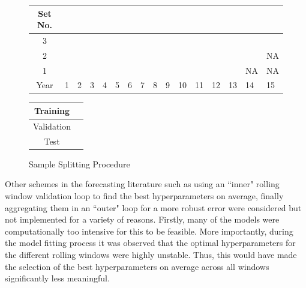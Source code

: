 \documentclass{article}
\begin{document}
\begin{figure}[!htb]
	\begin{center}
		\begin{tabular}{|c|p{0.30cm}p{0.30cm}p{0.30cm}p{0.30cm}p{0.30cm}p{0.30cm}p{0.30cm}p{0.30cm}p{0.30cm}p{0.30cm}p{0.30cm}p{0.30cm}p{0.30cm}p{0.30cm}p{0.30cm}|}
			\hline
			Set No. &&&&&&&&&&&&&&& \\
			\hline
			3 & \cellcolor{cyan} & \cellcolor{cyan} & \cellcolor{cyan} & \cellcolor{cyan} & \cellcolor{cyan} & \cellcolor{cyan} & \cellcolor{cyan} & \cellcolor{cyan} & \cellcolor{cyan} &
			\cellcolor{pink} & \cellcolor{pink} & \cellcolor{pink} & \cellcolor{pink} & \cellcolor{pink} & 	
			\cellcolor{olive} \\
			2 & \cellcolor{cyan} & \cellcolor{cyan} & \cellcolor{cyan} & \cellcolor{cyan} & \cellcolor{cyan} & \cellcolor{cyan} & \cellcolor{cyan} & \cellcolor{cyan} &
			\cellcolor{pink} & \cellcolor{pink} & \cellcolor{pink} & \cellcolor{pink} & \cellcolor{pink} & 	
			\cellcolor{olive} & NA  \\
			1 & \cellcolor{cyan} & \cellcolor{cyan} & \cellcolor{cyan} & \cellcolor{cyan} & \cellcolor{cyan} & \cellcolor{cyan} & \cellcolor{cyan} &
			\cellcolor{pink} & \cellcolor{pink} & \cellcolor{pink} & \cellcolor{pink} & \cellcolor{pink} & 	
			\cellcolor{olive} & NA & NA \\
			\hline
			Year & 1 & 2 & 3 & 4 & 5 & 6 & 7 & 8 & 9 & 10 & 11 & 12 & 13 & 14 & 15\\
			\hline
		\end{tabular}
		\medskip
		\begin{tabular}{|c|p{0.30cm}|}
			\hline
			Training & \cellcolor{cyan} \\
			\hline
			Validation & \cellcolor{pink} \\
			\hline
			Test & \cellcolor{olive} \\
			\hline
		\end{tabular}
	\end{center}
	\caption{Sample Splitting Procedure}
	\label{sample_split_diag}
\end{figure}

Other schemes in the forecasting literature such as using an ``inner" rolling window validation loop to find the best hyperparameters on average, finally aggregating them in an ``outer" loop for a more robust error were considered but not implemented for a variety of reasons. Firstly, many of the models were computationally too intensive for this to be feasible. More importantly, during the model fitting process it was observed that the optimal hyperparameters for the different rolling windows were highly unstable. Thus, this would have made the selection of the best hyperparameters on average across all windows significantly less meaningful.
\end{document}
